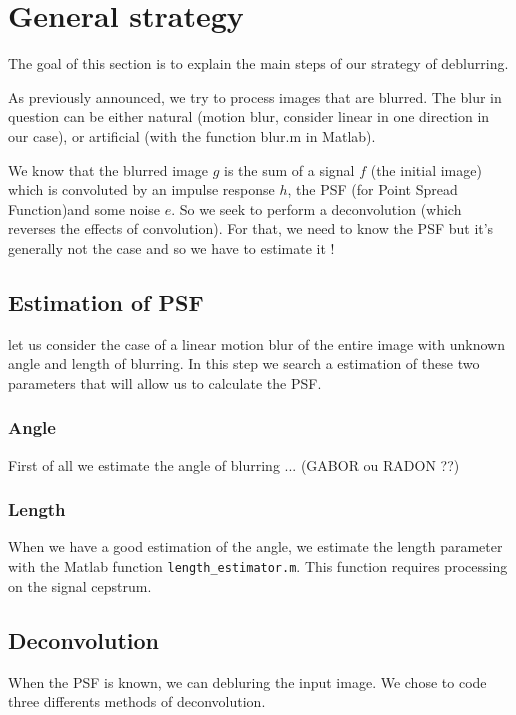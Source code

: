 

\chapter{General strategy}

The goal of this section is to explain the main steps of our strategy of deblurring.

As previously announced, we try to process images that are blurred. The blur in question can be either natural (motion blur, consider linear in one direction in our case), or artificial (with the function blur.m in Matlab).

We know that the blurred image $g$ is the sum of a signal $f$ (the initial image) which is convoluted by an impulse response $h$, the PSF (for Point Spread Function)and some noise $e$. So we seek to perform a deconvolution (which reverses the effects of convolution). For that, we need to know the PSF but it's generally not the case and so we have to estimate it ! 
  
\section{Estimation of PSF}

let us consider the case of a linear motion blur of the entire image with unknown angle and length of blurring. In this step we search a estimation of these two parameters that will allow us to calculate the PSF.
 
\subsection{Angle} 
First of all we estimate the angle of blurring ... (GABOR ou RADON ??)

\subsection{Length}
When we have a good estimation of the angle, we estimate the length parameter with the Matlab function \verb|length_estimator.m|. This function requires processing on the signal cepstrum. 

\section{Deconvolution}

When the PSF is known, we can debluring the input image. We chose to code three differents methods of deconvolution.

